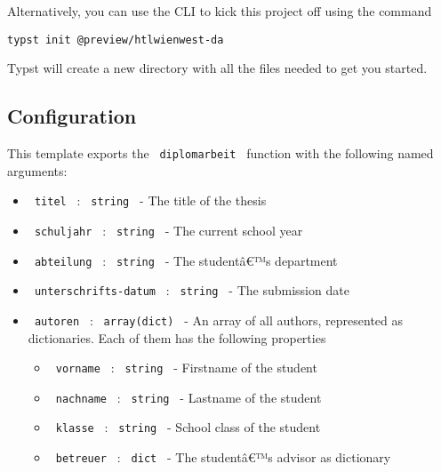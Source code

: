 Alternatively, you can use the CLI to kick this project off using the
command

\begin{verbatim}
typst init @preview/htlwienwest-da
\end{verbatim}

Typst will create a new directory with all the files needed to get you
started.

\subsection{Configuration}\label{configuration}

This template exports the \texttt{\ diplomarbeit\ } function with the
following named arguments:

\begin{itemize}
\tightlist
\item
  \texttt{\ titel\ } : \texttt{\ string\ } - The title of the thesis
\item
  \texttt{\ schuljahr\ } : \texttt{\ string\ } - The current school year
\item
  \texttt{\ abteilung\ } : \texttt{\ string\ } - The studentâ€™s
  department
\item
  \texttt{\ unterschrifts-datum\ } : \texttt{\ string\ } - The
  submission date
\item
  \texttt{\ autoren\ } : \texttt{\ array(dict)\ } - An array of all
  authors, represented as dictionaries. Each of them has the following
  properties

  \begin{itemize}
  \tightlist
  \item
    \texttt{\ vorname\ } : \texttt{\ string\ } - Firstname of the
    student
  \item
    \texttt{\ nachname\ } : \texttt{\ string\ } - Lastname of the
    student
  \item
    \texttt{\ klasse\ } : \texttt{\ string\ } - School class of the
    student
  \item
    \texttt{\ betreuer\ } : \texttt{\ dict\ } - The studentâ€™s advisor
    as dictionary


\end{itemize}
\end{itemize}
